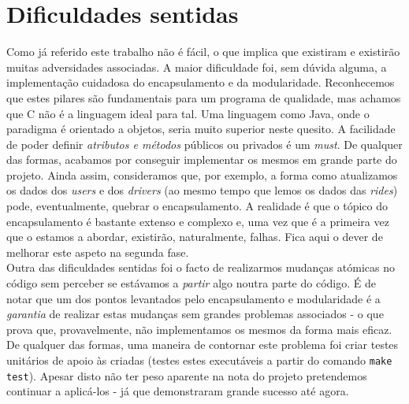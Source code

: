 \documentclass[12pt,a4paper]{report}
\begin{document}
\newpage

    \chapter{Dificuldades sentidas}
    Como já referido este trabalho não é fácil, o que implica que existiram e existirão muitas adversidades associadas. A maior dificuldade foi, sem dúvida alguma, a implementação cuidadosa do encapsulamento e da modularidade. Reconhecemos que estes pilares são fundamentais para um programa de qualidade, mas achamos que C não é a linguagem ideal para tal. Uma linguagem como Java, onde o paradigma é orientado a objetos, seria muito superior neste quesito. A facilidade de poder definir \textit{atributos e métodos} públicos ou privados é um \textit{must}. De qualquer das formas, acabamos por conseguir implementar os mesmos em grande parte do projeto. Ainda assim, consideramos que, por exemplo, a forma como atualizamos os dados dos \textit{users} e dos \textit{drivers} (ao mesmo tempo que lemos os dados das \textit{rides}) pode, eventualmente, quebrar o encapsulamento. A realidade é que o tópico do encapsulamento é bastante extenso e complexo e, uma vez que é a primeira vez que o estamos a abordar, existirão, naturalmente, falhas. Fica aqui o dever de melhorar este aspeto na segunda fase. \\
    Outra das dificuldades sentidas foi o facto de realizarmos mudanças atómicas no código sem perceber se estávamos a \textit{partir} algo noutra parte do código. É de notar que um dos pontos levantados pelo encapsulamento e modularidade é a \textit{garantia} de realizar estas mudanças sem grandes problemas associados - o que prova que, provavelmente, não implementamos os mesmos da forma mais eficaz. De qualquer das formas, uma maneira de contornar este problema foi criar testes unitários de apoio às  criadas (testes estes executáveis a partir do comando \texttt{make test}). Apesar disto não ter peso aparente na nota do projeto pretendemos continuar a aplicá-los - já que demonstraram grande sucesso até agora.
    
\newpage
\end{document}
